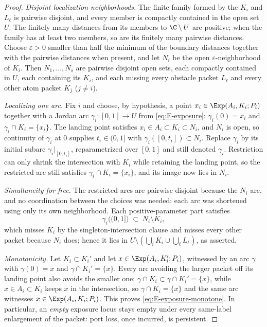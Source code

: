 \begin{proof}
\emph{Disjoint localization neighborhoods.}
The finite family formed by the $K_i$ and $L_\ell$ is pairwise disjoint,
and every member is compactly contained in the open set $U$.  The finitely
many distances from its members to $\C\setminus U$ are positive; when the
family has at least two members, so are its finitely many pairwise
distances.  Choose $\varepsilon>0$ smaller than half the minimum of the
boundary distances together with the pairwise distances when present, and let $N_i$
be the open $\varepsilon$-neighborhood of $K_i$. Then $N_1,\dots,N_s$ are pairwise
disjoint open sets, each compactly contained in $U$, each containing its $K_i$, and
each missing every obstacle packet $L_\ell$ and every other atom packet $K_j$
($j\neq i$).

\emph{Localizing one arc.}
Fix $i$ and choose, by hypothesis, a point $x_i\in\Exp(A_i,K_i;P_i)$ together with a
Jordan arc $\gamma_i\colon[0,1]\to U$ from \eqref{eq:E-exposure}:
$\gamma_i(0)=x_i$ and $\gamma_i\cap K_i=\{x_i\}$. The landing point satisfies
$x_i\in A_i\subset K_i\subset N_i$, and $N_i$ is open, so continuity of $\gamma_i$ at
$0$ supplies $t_i\in(0,1]$ with $\gamma_i([0,t_i])\subset N_i$. Replace $\gamma_i$ by
its initial subarc $\gamma_i|_{[0,t_i]}$, reparametrized over $[0,1]$ and still
denoted $\gamma_i$. Restriction can only shrink the intersection with $K_i$ while
retaining the landing point, so the restricted arc still satisfies
$\gamma_i\cap K_i=\{x_i\}$, and its image now lies in $N_i$.

\emph{Simultaneity for free.}
The restricted arcs are pairwise disjoint because the $N_i$ are, and no coordination
between the choices was needed: each arc was shortened using only its own
neighborhood. Each positive-parameter part satisfies
\[
\gamma_i\bigl((0,1]\bigr)\;\subset\;N_i\setminus K_i,
\]
which misses $K_i$ by the singleton-intersection clause and misses every other packet
because $N_i$ does; hence it lies in
$U\setminus(\bigcup_iK_i\cup\bigcup_\ell L_\ell)$, as asserted.

\emph{Monotonicity.}
Let $K_i\subset K_i'$ and let $x\in\Exp(A_i,K_i';P_i)$, witnessed by an arc $\gamma$
with $\gamma(0)=x$ and $\gamma\cap K_i'=\{x\}$. Every arc avoiding the larger packet
off its landing point also avoids the smaller one: $\gamma\cap K_i\subset
\gamma\cap K_i'=\{x\}$, while $x\in A_i\subset K_i$ keeps $x$ in the intersection, so
$\gamma\cap K_i=\{x\}$ and the same arc witnesses $x\in\Exp(A_i,K_i;P_i)$. This
proves \eqref{eq:E-exposure-monotone}. In particular, an \emph{empty} exposure locus
stays empty under every same-label enlargement of the packet: port loss, once
incurred, is persistent.
\end{proof}

